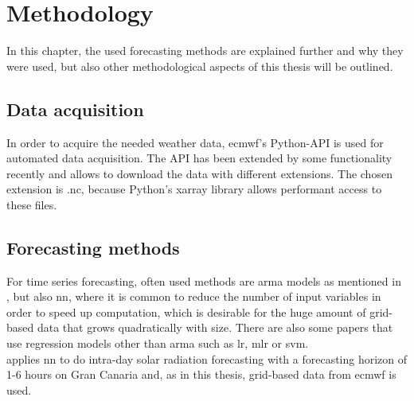 \chapter{Methodology}
\label{ch:methods}

In this chapter, the used forecasting methods are explained further and why they were used, but also other methodological aspects of this thesis will be outlined.\\


\section{Data acquisition}
\label{sec:dataq}

In order to acquire the needed weather data, \gls{ecmwf}'s Python-API is used for automated data acquisition. The API has been extended by some functionality recently and allows to download the data with different extensions. The chosen extension is .nc, because Python's xarray library allows performant access to these files.\\

\section{Forecasting methods}
\label{sec:forecastmet}

For time series forecasting, often used methods are \eg \gls{arma} models as mentioned in , but  also \gls{nn}, where it is common to reduce the number of input variables in order to speed up computation, which is desirable for the huge amount of grid-based data that grows quadratically with size. There are also some papers that use regression models other than \gls{arma} such as \gls{lr}, \gls{mlr} or \gls{svm}.\\
 applies \gls{nn} to do intra-day solar radiation forecasting with a forecasting horizon of 1-6 hours on Gran Canaria and, as in this thesis, grid-based data from \gls{ecmwf} is used.\\

